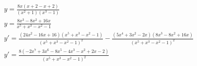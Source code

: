 \begin{ex}
\begin{align}
&y=\frac{8x(x+2-x+2)}{(x^2+1)(x^3-1)}\nonumber\\
&y=\frac{8x^3-8x^2+16x}{x^5+x^3-x^2-1}\nonumber\\
&y'=\frac{(24x^2-16x+16)(x^5+x^3-x^2-1)}{(x^5+x^3-x^2-1)^2}-\frac{(5x^4+3x^2-2x)(8x^3-8x^2+16x)}{(x^5+x^3-x^2-1)^2}\nonumber\\
&y'=\frac{8(-2x^7+3x^6-8x^5-4x^3-x^2+2x-2)}{(x^5+x^3-x^2-1)^2}\nonumber
\end{align}
\end{ex}
